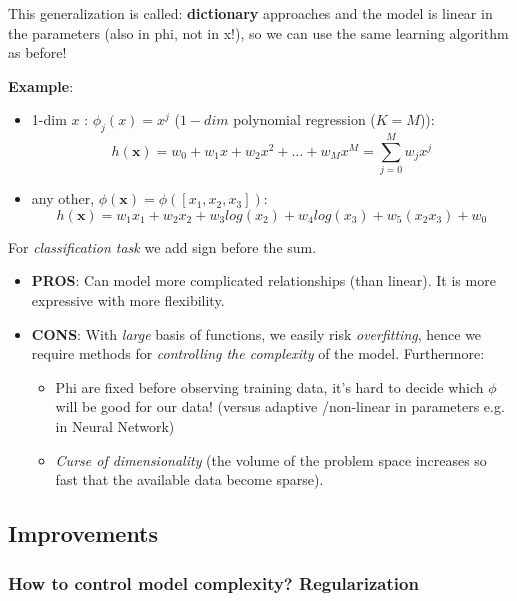 \documentclass[../main.tex]{subfiles}
\begin{document}
This generalization is called: \textbf{dictionary} approaches and the model is linear in the parameters (also in phi, not in x!), so we can use the same learning algorithm as before!

\textbf{Example}:
\begin{itemize}
    \item 1-dim $x$ : $\phi_j(x) = x^j$ ($1-dim$ polynomial regression ($K=M$)):
    $$ h(\mathbf{x}) = w_0 + w_1x + w_2x^2 + \dots + w_Mx^M = \sum_{j = 0}^M w_jx^j$$
    
    \item any other, $\phi(\mathbf{x}) = \phi([x_1, x_2, x_3])$:
    $$  h(\mathbf{x}) = w_1x_1 + w_2x_2 + w_3 log(x_2)+ w_4 log(x_3) + w_5(x_2x_3) + w_0 $$
\end{itemize}

For \emph{classification task} we add sign before the sum.
\begin{itemize}
    \item \textbf{PROS}: Can model more complicated relationships (than linear). It is more expressive with more flexibility.
    \item \textbf{CONS}: With \emph{large} basis of functions, we easily risk \emph{overfitting}, hence we require methods for \emph{controlling the complexity} of the model. Furthermore:
    \begin{itemize}
        \item Phi are fixed before observing training data, it's hard to decide which $\phi$ will be good for our data! (versus adaptive /non-linear in parameters e.g. in Neural Network)
        \item \textit{Curse of dimensionality} (the volume of the problem space increases so fast that the available data become sparse).
    \end{itemize}
\end{itemize}

\subsection{Improvements}
\subsubsection{How to control model complexity? Regularization}
\end{document}
